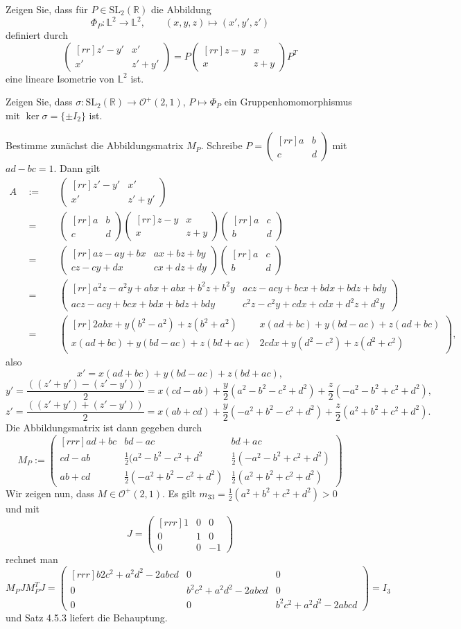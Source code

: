 \documentclass[11pt]{book}
\numberwithin{dummy}{section}
\theoremstyle{nonumberbreak}
\newenvironment{prob}[1][]{\ifthenelse{\equal{#1}{}}{\problem}{\problem[#1]}\rm}{\endproblem}
\newenvironment{sol}[1][]{\ifthenelse{\equal{#1}{}}{\solution}{\solution[#1]}\rm}{\endsolution}
\newcommand{\Loid}{\mathbb{L}}
\newcommand{\R}{\mathbb{R}}
\newcommand{\la}{\longrightarrow}
\newcommand{\matx}[4]{\begin{pmatrix}[rr]#1 & #2 \\[-6pt] #3 & #4 \end{pmatrix}}
\newcommand{\matxx}[4]{\begin{pmatrix}[rr]#1 & #2 \\ #3 & #4 \end{pmatrix}}
\newcommand{\Matx}[9]{\begin{pmatrix}[rrr]#1 & #2 & #3 \\ #4 & #5 & #6 \\ #7 & #8 & #9 \end{pmatrix}}
\begin{document}
\begin{spacing}{1.4}
\begin{prob}
\begin{sol}
\begin{compactenum}
\end{compactenum}
\end{sol}


\end{prob}







\begin{prob}
\begin{compactenum}
\item Zeigen Sie, dass für $P \in \mathrm{SL}_2(\R)$ die Abbildung 
$$\Phi_P: \Loid^2 \la \Loid^2, \qquad (x,y,z) \mapsto (x',y',z')$$
definiert durch 
$$\matx{z'-y'}{x'}{x'}{z'+y'} = P \matxx{z-y}{x}{x}{z+y}P^T$$
eine lineare Isometrie von $\Loid^2$ ist.
\item Zeigen Sie, dass $\sigma: \mathrm{SL}_2(\R) \la \mathcal{O}^+(2,1)$, $P\mapsto \Phi_P$ ein Gruppenhomomorphismus mit $\ker \sigma = \{\pm I_2\}$ ist.
\end{compactenum}

\begin{sol}
\begin{compactenum}
\item Bestimme zunächst die Abbildungsmatrix $M_P$. Schreibe $P=\matx{a}{b}{c}{d}$ mit $ad-bc=1$. Dann gilt
\begin{alignat*}{5}
A\ \ &:=&& \ \ \matx{z'-y'}{x'}{x'}{z'+y'}\\
&=&& \ \ \matxx{a}{b}{c}{d} \matx{z-y}{x}{x}{z+y} \matx{a}{c}{b}{d} \\
&=&& \ \ \matxx{az-ay+bx}{ax+bz+by}{cz-cy+dx}{cx+dz+dy} \matx{a}{c}{b}{d} \\
&=&& \ \ \matxx{a^2z-a^2y+abx+abx+b^2z+b^2y}{acz-acy+bcx+bdx+bdz+bdy}{acz-acy+bcx+bdx+bdz+bdy}{c^2z-c^2y+cdx+cdx+d^2z+d^2y} \\
&=&& \ \ \matxx{2abx+y(b^2-a^2)+z(b^2+a^2)}{x(ad+bc)+y(bd-ac)+z(ad+bc)}{x(ad+bc)+y(bd-ac)+z(bd+ac)}{2cdx+y(d^2-c^2)+z(d^2+c^2)},
\end{alignat*}
also 
$$x'=x(ad+bc)+y(bd-ac) + z(bd+ac),$$
$$y'=\frac{\left( (z'+y')-(z'-y')\right)}{2} = x(cd-ab) + \frac{y}{2}(a^2-b^2-c^2+d^2) + \frac{z}{2}(-a^2-b^2+c^2+d^2),$$
$$z'=\frac{\left((z'+y')+(z'-y')\right)}{2} = x(ab+cd) + \frac{y}{2}(-a^2+b^2-c^2+d^2) + \frac{z}{2}(a^2+b^2+c^2+d^2).$$
Die Abbildungsmatrix ist dann gegeben durch 
$$M_P:= \Matx{ad+bc}{bd-ac}{bd+ac}{cd-ab}{\frac{1}{2}(a^2-b^2-c^2+d^2}{\frac{1}{2}(-a^2-b^2+c^2+d^2)}{ab+cd}{\frac{1}{2}(-a^2+b^2-c^2+d^2)}{\frac{1}{2}(a^2+b^2+c^2+d^2)}$$
Wir zeigen nun, dass $M \in \mathcal{O}^+(2,1)$. Es gilt $m_{33}=\frac{1}{2}(a^2+b^2+c^2+d^2) >0$ und mit 
$$J=\Matx{1}{0}{0}{0}{1}{0}{0}{0}{-1}$$
rechnet man 
$$M_PJM_P^T J= \Matx{b2c^2+a^2d^2-2abcd}{0}{0}{0}{b^2c^2+a^2d^2-2abcd}{0}{0}{0}{b^2c^2+a^2d^2-2abcd} = I_3$$
und Satz 4.5.3 liefert die Behauptung.



\end{compactenum}
\end{sol}
\end{prob}
\end{spacing}
\end{document}
